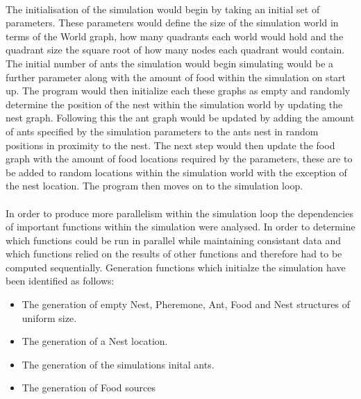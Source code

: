 \documentclass[main.tex]{subfiles}
\begin{document}
\paragraph{}The initialisation of the simulation would begin by taking an initial set of parameters. These parameters would define the size of the simulation world in terms of the World graph, how many quadrants each world would hold and the quadrant size the square root of how many nodes each quadrant would contain. The initial number of ants the simulation would begin simulating would be a further parameter along with the amount of food within the simulation on start up. The program would then initialize each these graphs as empty and randomly determine the position of the nest within the simulation world by updating the nest graph. Following this the ant graph would be updated by adding the amount of ants specified by the simulation parameters to the ants nest in random positions in proximity to the nest. The next step would then update the food graph with the amount of food locations required by the parameters, these are to be added to random locations within the simulation world with the exception of the nest location. The program then moves on to the simulation loop.

\paragraph{}In order to produce more parallelism within the simulation loop the dependencies of important functions within the simulation were analysed. In order to determine which functions could be run in parallel while maintaining consistant data and which functions relied on the results of other functions and therefore had to be computed sequentially. Generation functions which initialze the simulation have been identified as follows:
\begin{itemize}
        \item The generation of empty Nest, Pheremone, Ant, Food and Nest structures of uniform size.
        \item The generation of a Nest location.
        \item The generation of the simulations inital ants.
        \item The generation of Food sources
\end{itemize}
\end{document}
